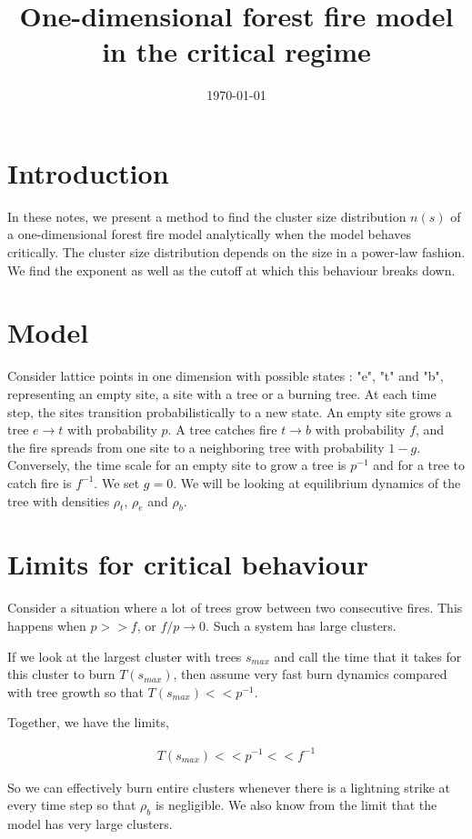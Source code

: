 \documentclass{article}
\title{One-dimensional forest fire model in the critical regime}
\date{\today}
\numberwithin{equation}{section}
\begin{document}
\maketitle

\section{Introduction}
In these notes, we present a method to find the cluster size distribution $n(s)$ of a one-dimensional forest fire model analytically when the model behaves critically. The cluster size distribution depends on the size in a power-law fashion. We find the exponent as well as the cutoff at which this behaviour breaks down.  

\section{Model}
Consider lattice points in one dimension with possible states : "e", "t" and "b", representing an empty site, a site with a tree or a burning tree. At each time step, the sites transition probabilistically to a new state. An empty site grows a tree $e \rightarrow t$ with probability $p$. A tree catches fire $t \rightarrow b$ with probability $f$, and the fire spreads from one site to a neighboring tree with probability $1 - g$. Conversely, the time scale for an empty site to grow a tree is $p^{-1}$ and for a tree to catch fire is $f^{-1}$. We set $g = 0$. We will be looking at equilibrium dynamics of the tree with densities $\rho_t$, $\rho_e$ and $\rho_b$.

\section{Limits for critical behaviour}
Consider a situation where a lot of trees grow between two consecutive fires. This happens when $p >> f$, or $f/p \rightarrow 0$. Such a system has large clusters. 

If we look at the largest cluster with trees $s_{max}$ and call the time that it takes for this cluster to burn $T(s_{max})$, then assume very fast burn dynamics compared with tree growth so that $T(s_{max}) << p^{-1}$. 

Together, we have the limits, 

\begin{align}
T(s_{max}) << p^{-1} << f^{-1}
\end{align}

So we can effectively burn entire clusters whenever there is a lightning strike at every time step so that $\rho_b$ is negligible. We also know from the limit that the model has very large clusters. 
\end{document}
